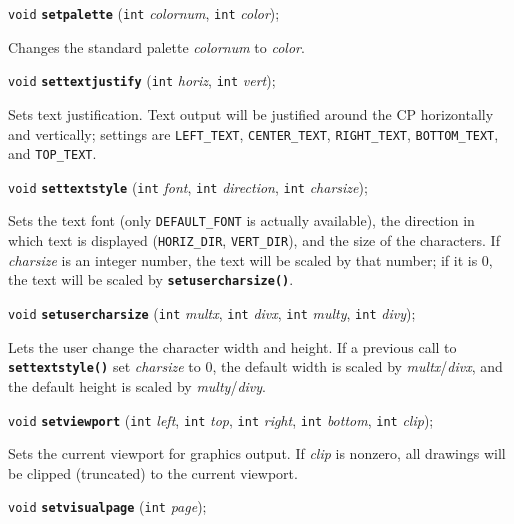 \documentclass[a4paper,11pt]{article}
\newcommand{\V}{\texttt{void}}      %
\newcommand{\I}{\texttt{int}}       %
\newcommand{\func}[1]{\textbf{\texttt{#1}}}  %
\newcommand{\A}[1]{\emph{#1}}       %
\newcommand{\T}[1]{\texttt{#1}}     %
\newenvironment{bgi}
{ %
  \begin{snugshade}
}
{ %
  \end{snugshade}
}
\begin{document}

\begin{bgi}
\V{} \func{setpalette} (\I{} \A{colornum}, \I{} \A{color}); 
\end{bgi}

Changes the standard palette \A{colornum} to \A{color}.


\begin{bgi}
\V{} \func{settextjustify} (\I{} \A{horiz}, \I{} \A{vert});
\end{bgi}

Sets text justification. Text output will be justified around the CP
horizontally and vertically; settings are \T{LEFT\_TEXT},
\T{CENTER\_TEXT}, \T{RIGHT\-\_TEXT}, \T{BOTTOM\_TEXT}, and
\T{TOP\_TEXT}.


\begin{bgi}
\V{} \func{settextstyle} (\I{} \A{font}, \I{} \A{direction}, \I{}
\A{charsize});
\end{bgi}

Sets the text font (only \T{DEFAULT\_FONT} is actually available), the
direction in which text is displayed (\T{HORIZ\_DIR}, \T{VERT\_DIR}),
and the size of the characters. If \A{charsize} is an integer number,
the text will be scaled by that number; if it is 0, the text will be
scaled by \func{setusercharsize()}.



\begin{bgi}
\V{} \func{setusercharsize} (\I{} \A{multx}, \I{} \A{divx}, \I{}
\A{multy}, \I{} \A{divy});
\end{bgi}

Lets the user change the character width and height. If a previous
call to \func{settextstyle()} set \A{charsize} to 0, the default width
is scaled by \A{multx}/\A{divx}, and the default height is scaled by
\A{multy}/\A{divy}.


\begin{bgi}
\V{} \func{setviewport} (\I{} \A{left}, \I{} \A{top}, \I{} \A{right},
\I{} \A{bottom}, \I{} \A{clip});
\end{bgi}

Sets the current viewport for graphics output. If \A{clip} is nonzero,
all drawings will be clipped (truncated) to the current viewport.


\begin{bgi}
\V{} \func{setvisualpage} (\I{} \A{page});
\end{bgi}
\end{document}
